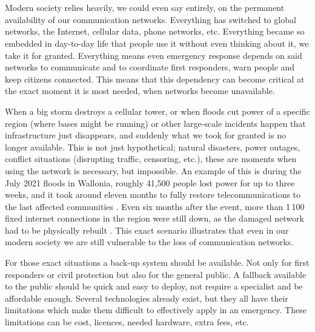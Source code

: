 
\chapter{}%
\label{ch:inleiding}


Modern society relies heavily, we could even say entirely, on the permanent availability of our communication networks.
Everything has switched to global networks, the Internet, cellular data, phone networks, etc. Everything became so embedded in day-to-day life that people use it without even thinking about it, we take it for granted.
Everything means even emergency response depends on said networks to communicate and to coordinate first responders, warn people and keep citizens connected.
This means that this dependency can become critical at the exact moment it is most needed, when networks become unavailable.

When a big storm destroys a cellular tower, or when floods cut power of a specific region (where bases might be running) or other large-scale incidents happen that infrastructure just disappears, and suddenly what we took for granted is no longer available.
This is not just hypothetical; natural disasters, power outages, conflict situations (disrupting traffic, censoring, etc.), these are moments when using the network is necessary, but impossible.
An example of this is during the July 2021 floods in Wallonia, roughly 41,500 people lost power for up to three weeks, and it took around eleven months to fully restore telecommunications to the last affected communities \autocite{Koks2022Infrastructure}.
Even six months after the event, more than 1\,100 fixed internet connections in the region were still down, as the damaged network had to be physically rebuilt \autocite{DeMorgen2022Internet}.
This exact scenario illustrates that even in our modern society we are still vulnerable to the loss of communication networks.

For those exact situations a back-up system should be available. Not only for first responders or civil protection but also for the general public.
A fallback available to the public should be quick and easy to deploy, not require a specialist and be affordable enough.
Several technologies already exist, but they all have their limitations which make them difficult to effectively apply in an emergency.
These limitations can be cost, licences, needed hardware, extra fees, etc.

